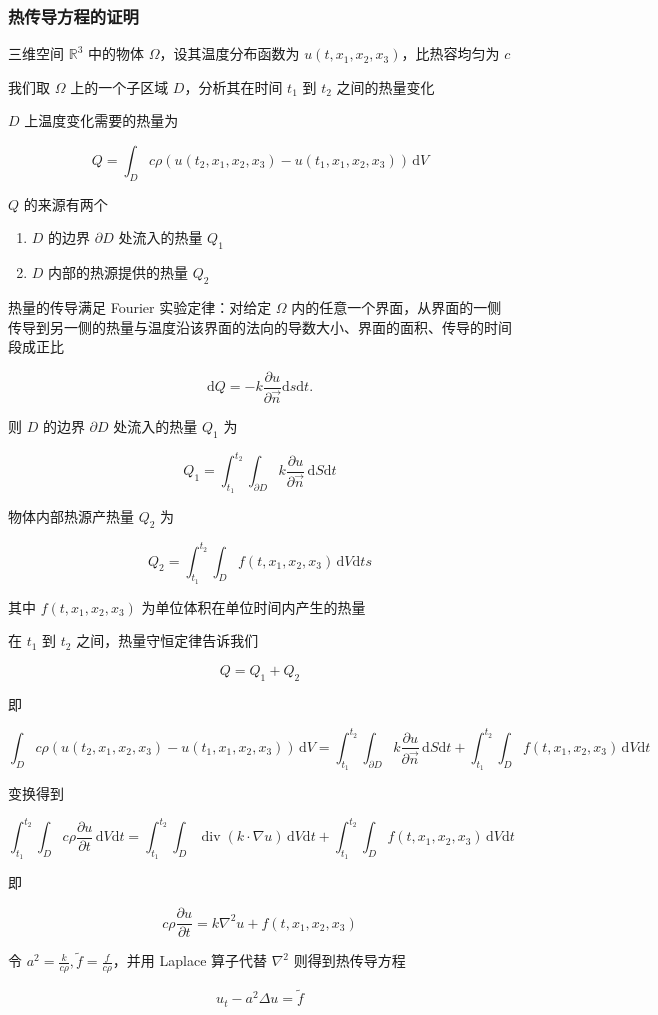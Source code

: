 \documentclass{beamer}
\begin{document}
\begin{frame}[allowframebreaks]
	\frametitle{热传导方程的证明}
	三维空间 $\mathbb{R}^3$ 中的物体 $\Omega$，设其温度分布函数为 $u(t,x_1,x_2,x_3)$，比热容均匀为 $c$

	我们取 $\Omega$ 上的一个子区域 $D$，分析其在时间 $t_1$ 到 $t_2$ 之间的热量变化

	$D$ 上温度变化需要的热量为

	$$
		Q=\int_D c\rho(u(t_2,x_1,x_2,x_3)-u(t_1,x_1,x_2,x_3))\,\mathrm{d}V
	$$

	$Q$ 的来源有两个

	\begin{enumerate}
		\item $D$ 的边界 $\partial D$ 处流入的热量 $Q_1$
		\item $D$ 内部的热源提供的热量 $Q_2$
	\end{enumerate}

	热量的传导满足 Fourier 实验定律：对给定 $\Omega$ 内的任意一个界面，从界面的一侧传导到另一侧的热量与温度沿该界面的法向的导数大小、界面的面积、传导的时间段成正比

	$$
		\mathrm{d}Q=-k\frac{\partial u}{\partial \vec{n}}\mathrm{d}s\mathrm{d}t.
	$$

	则 $D$ 的边界 $\partial D$ 处流入的热量 $Q_1$ 为

	$$
		Q_1=\int_{t_1}^{t_2}\int_{\partial D}k\frac{\partial u}{\partial \vec{n}}\,\mathrm{d}S\mathrm{d}t
	$$

	物体内部热源产热量 $Q_2$ 为

	$$
		Q_2=\int_{t_1}^{t_2}\int_D f(t,x_1,x_2,x_3)\,\mathrm{d}V\mathrm{d}ts
	$$

	其中 $f(t,x_1,x_2,x_3)$ 为单位体积在单位时间内产生的热量

	在 $t_1$ 到 $t_2$ 之间，热量守恒定律告诉我们

	$$
		Q=Q_1+Q_2
	$$

	即

	$$
		\int_D c\rho(u(t_2,x_1,x_2,x_3)-u(t_1,x_1,x_2,x_3))\,\mathrm{d}V=\int_{t_1}^{t_2}\int_{\partial D}k\frac{\partial u}{\partial \vec{n}}\,\mathrm{d}S\mathrm{d}t+\int_{t_1}^{t_2}\int_D f(t,x_1,x_2,x_3)\,\mathrm{d}V\mathrm{d}t
	$$

	变换得到

	$$
		\int_{t_1}^{t_2}\int_D c\rho\frac{\partial u}{\partial t}\,\mathrm{d}V\mathrm{d}t=\int_{t_1}^{t_2}\int_{D}\operatorname{div}(k\cdot\nabla u)\,\mathrm{d}V\mathrm{d}t+\int_{t_1}^{t_2}\int_D f(t,x_1,x_2,x_3)\,\mathrm{d}V\mathrm{d}t
	$$

	即

	$$
		c\rho\frac{\partial u}{\partial t}=k\nabla^2 u+f(t,x_1,x_2,x_3)
	$$

	令 $a^2=\frac{k}{c\rho},\tilde{f}=\frac{f}{c\rho}$，并用 Laplace 算子代替 $\nabla^2$ 则得到热传导方程

	$$
		u_t-a^2\Delta u=\tilde{f}
	$$
\end{frame}
\end{document}
